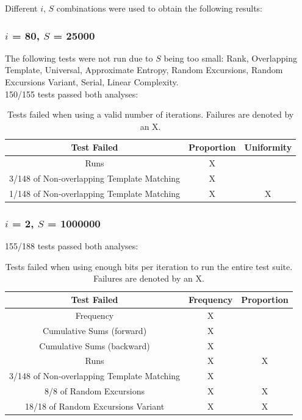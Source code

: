 \documentclass[12pt]{article}
\begin{document}
    Different $i$, $S$ combinations were used to obtain the following results:

    \subsubsection{$i$ = 80, $S$ = 25000}
      The following tests were not run due to $S$ being too small: Rank, Overlapping Template, Universal, Approximate Entropy, Random Excursions, Random Excursions Variant, Serial, Linear Complexity.\\

      150/155 tests passed both analyses:
      \begin{table}[H]
        \centering
        \begin{tabular}{|c||c|c|}
          \hline
          Test Failed & Proportion & Uniformity\\
          \hline
          \hline
          Runs & X & \\
          \hline
          3/148 of Non-overlapping Template Matching & X & \\
          \hline
          1/148 of Non-overlapping Template Matching & X & X\\
          \hline
        \end{tabular}
        \caption{Tests failed when using a valid number of iterations. Failures are denoted by an X. }
        \label{table:nist_80}
      \end{table}

      \subsubsection{$i$ = 2, $S$ = 1000000}
        155/188 tests passed both analyses:
        \begin{table}[H]
          \centering
          \begin{tabular}{|c||c|c|}
            \hline
            Test Failed & Frequency & Proportion\\
            \hline
            \hline
            Frequency & X & \\
            \hline
            Cumulative Sums (forward) & X & \\
            \hline
            Cumulative Sums (backward) & X & \\
            \hline
            Runs & X & X\\
            \hline
            3/148 of Non-overlapping Template Matching & X & \\
            \hline
            8/8 of Random Excursions & X & X\\
            \hline
            18/18 of Random Excursions Variant & X & X\\
            \hline
          \end{tabular}
          \caption{Tests failed when using enough bits per iteration to run the entire test suite. Failures are denoted by an X.}
          \label{table:nist_2}
        \end{table}
\end{document}
